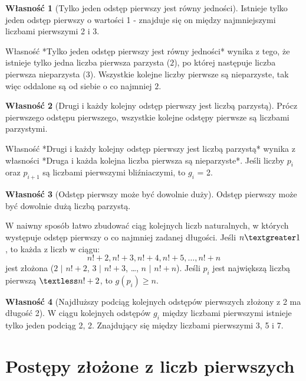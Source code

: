 \documentclass[10pt,onecolumn]{article}
\theoremstyle{definition}
\theoremstyle{hypothesis}
\theoremstyle{capability}
\newtheorem{capability}{Własność}
\begin{document}
\begin{capability}[Tylko jeden odstęp pierwszy jest równy jedności]
Istnieje tylko jeden odstęp pierwszy o wartości 1 - znajduje się on między najmniejszymi liczbami pierwszymi 2 i 3.
\end{capability}

Własność *Tylko jeden odstęp pierwszy jest równy jedności* wynika z tego, że istnieje tylko jedna liczba pierwsza parzysta ($2$), po której następuje liczba pierwsza nieparzysta ($3$). Wszystkie kolejne liczby pierwsze są nieparzyste, tak więc oddalone są od siebie o co najmniej $2$.

\begin{capability}[Drugi i każdy kolejny odstęp pierwszy jest liczbą parzystą]
Prócz pierwszego odstępu pierwszego, wszystkie kolejne odstępy pierwsze są liczbami parzystymi.
\end{capability}

Własność *Drugi i każdy kolejny odstęp pierwszy jest liczbą parzystą* wynika z własności *Druga i każda kolejna liczba pierwsza są nieparzyste*. Jeśli liczby $p_i$ oraz $p_{i+1}$ są liczbami pierwszymi bliźniaczymi, to $g_i$ = 2. 

\begin{capability}[Odstęp pierwszy może być dowolnie duży]
Odstęp pierwszy może być dowolnie dużą liczbą parzystą.
\end{capability}

W naiwny sposób łatwo zbudować ciąg kolejnych liczb naturalnych, w których występuje odstęp pierwszy o co najmniej zadanej długości. Jeśli $n \textgreater 1$, to każda z liczb w ciągu: $$n!+2, n!+3, n!+4, n!+5, \ldots, n!+n$$ jest złożona ($2$ $\mid$ $n!+2$, $3$ $\mid$ $n!+3$, \ldots, $n$ $\mid$ $n!+n$). Jeśli $p_i$ jest największą liczbą pierwszą $\textless n!+2$, to $g(p_i) \geq n$. 

\begin{capability}[Najdłuższy podciąg kolejnych odstępów pierwszych złożony z 2 ma długość 2]
W ciągu kolejnych odstępów $g_i$ między liczbami pierwszymi istnieje tylko jeden podciąg 2, 2. Znajdujący się między liczbami pierwszymi 3, 5 i 7.
\end{capability}



\newpage


\section{Postępy złożone z liczb pierwszych}
\end{document}

